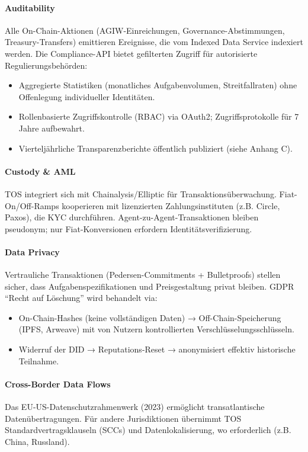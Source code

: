 \documentclass[11pt]{article}
\begin{document}
\paragraph{Auditability}
Alle On-Chain-Aktionen (AGIW-Einreichungen, Governance-Abstimmungen, Treasury-Transfers) emittieren Ereignisse, die vom Indexed Data Service indexiert werden. Die Compliance-API bietet gefilterten Zugriff für autorisierte Regulierungsbehörden:
\begin{itemize}[noitemsep]
  \item Aggregierte Statistiken (monatliches Aufgabenvolumen, Streitfallraten) ohne Offenlegung individueller Identitäten.
  \item Rollenbasierte Zugriffskontrolle (RBAC) via OAuth2; Zugriffsprotokolle für 7 Jahre aufbewahrt.
  \item Vierteljährliche Transparenzberichte öffentlich publiziert (siehe Anhang C).
\end{itemize}

\paragraph{Custody \& AML}
TOS integriert sich mit Chainalysis/Elliptic für Transaktionsüberwachung. Fiat-On/Off-Ramps kooperieren mit lizenzierten Zahlungsinstituten (z.B. Circle, Paxos), die KYC durchführen. Agent-zu-Agent-Transaktionen bleiben pseudonym; nur Fiat-Konversionen erfordern Identitätsverifizierung.

\paragraph{Data Privacy}
Vertrauliche Transaktionen (Pedersen-Commitments + Bulletproofs) stellen sicher, dass Aufgabenspezifikationen und Preisgestaltung privat bleiben. GDPR ``Recht auf Löschung'' wird behandelt via:
\begin{itemize}[noitemsep]
  \item On-Chain-Hashes (keine vollständigen Daten) → Off-Chain-Speicherung (IPFS, Arweave) mit von Nutzern kontrollierten Verschlüsselungsschlüsseln.
  \item Widerruf der DID → Reputations-Reset → anonymisiert effektiv historische Teilnahme.
\end{itemize}

\paragraph{Cross-Border Data Flows}
Das EU-US-Datenschutzrahmenwerk (2023) ermöglicht transatlantische Datenübertragungen. Für andere Jurisdiktionen übernimmt TOS Standardvertragsklauseln (SCCs) und Datenlokalisierung, wo erforderlich (z.B. China, Russland).
\end{document}
